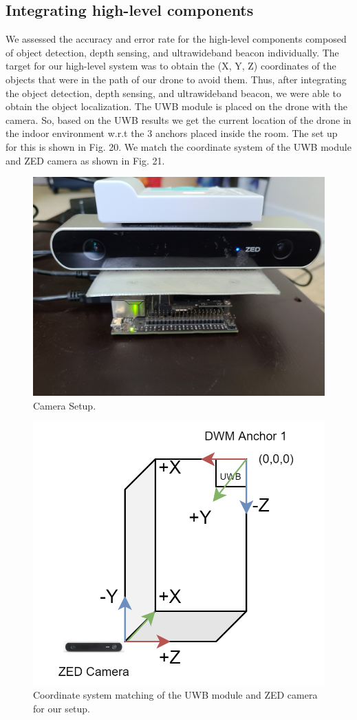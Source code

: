 \documentclass{IEEEtran}
\begin{document}
\subsection{Integrating high-level components}
We assessed the accuracy and error rate for the high-level components composed of object detection, depth sensing, and ultrawideband beacon individually. The target for our high-level system was to obtain the (X, Y, Z) coordinates of the objects that were in the path of our drone to avoid them. Thus, after integrating the object detection, depth sensing, and ultrawideband beacon, we were able to obtain the object localization. The UWB module is placed on the drone with the camera. So, based on the UWB results we get the current location of the drone in the indoor environment w.r.t the 3 anchors placed inside the room. The set up for this is shown in Fig. 20. We match the coordinate system of the UWB module and ZED camera as shown in Fig. 21.

\begin{figure}[htb]
\centering
\includegraphics[width=0.7\linewidth]{fig/zed_setup_jay.jpg}
\caption{Camera Setup.} \label{fig.structure}
\end{figure}

\begin{figure}[htb]
\centering
\includegraphics[width=0.5\linewidth]{fig/coordinate_matching.png}
\caption{Coordinate system matching of the UWB module and ZED camera for our setup.} \label{fig.structure}
\end{figure}
\end{document}
